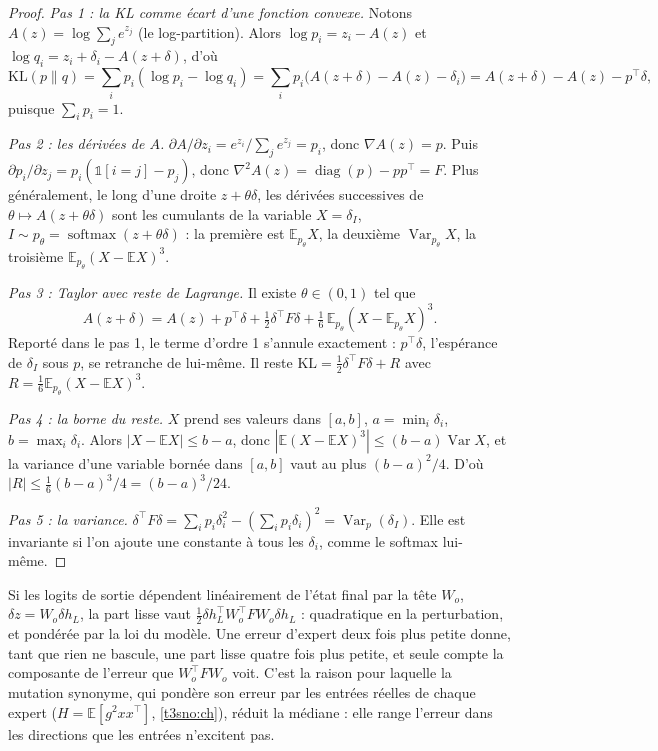 \begin{proof}
\emph{Pas 1 : la KL comme écart d'une fonction convexe.} Notons $A(z) = \log \sum_j e^{z_j}$ (le log-partition). Alors $\log p_i = z_i - A(z)$ et $\log q_i = z_i + \delta_i - A(z + \delta)$, d'où
\[
\mathrm{KL}(p\|q) = \sum_i p_i (\log p_i - \log q_i) = \sum_i p_i \bigl(A(z+\delta) - A(z) - \delta_i\bigr) = A(z + \delta) - A(z) - p^{\top}\delta,
\]
puisque $\sum_i p_i = 1$.

\emph{Pas 2 : les dérivées de $A$.} $\partial A/\partial z_i = e^{z_i}/\sum_j e^{z_j} = p_i$, donc $\nabla A(z) = p$. Puis $\partial p_i/\partial z_j = p_i(\mathbb{1}[i=j] - p_j)$, donc $\nabla^2 A(z) = \operatorname{diag}(p) - p p^{\top} = F$. Plus généralement, le long d'une droite $z + \theta\delta$, les dérivées successives de $\theta \mapsto A(z + \theta\delta)$ sont les cumulants de la variable $X = \delta_I$, $I \sim p_\theta = \operatorname{softmax}(z + \theta\delta)$ : la première est $\mathbb{E}_{p_\theta}X$, la deuxième $\operatorname{Var}_{p_\theta}X$, la troisième $\mathbb{E}_{p_\theta}(X - \mathbb{E}X)^3$.

\emph{Pas 3 : Taylor avec reste de Lagrange.} Il existe $\theta \in (0, 1)$ tel que
\[
A(z+\delta) = A(z) + p^{\top}\delta + \tfrac12 \delta^{\top}F\delta + \tfrac16\, \mathbb{E}_{p_\theta}(X - \mathbb{E}_{p_\theta}X)^3.
\]
Reporté dans le pas 1, le terme d'ordre 1 s'annule exactement : $p^{\top}\delta$, l'espérance de $\delta_I$ sous $p$, se retranche de lui-même. Il reste $\mathrm{KL} = \frac12\delta^{\top}F\delta + R$ avec $R = \frac16\mathbb{E}_{p_\theta}(X - \mathbb{E}X)^3$.

\emph{Pas 4 : la borne du reste.} $X$ prend ses valeurs dans $[a, b]$, $a = \min_i\delta_i$, $b = \max_i\delta_i$. Alors $|X - \mathbb{E}X| \le b - a$, donc $|\mathbb{E}(X-\mathbb{E}X)^3| \le (b-a)\operatorname{Var}X$, et la variance d'une variable bornée dans $[a,b]$ vaut au plus $(b-a)^2/4$. D'où $|R| \le \frac16 (b-a)^3/4 = (b-a)^3/24$.

\emph{Pas 5 : la variance.} $\delta^{\top}F\delta = \sum_i p_i\delta_i^2 - (\sum_i p_i\delta_i)^2 = \operatorname{Var}_p(\delta_I)$. Elle est invariante si l'on ajoute une constante à tous les $\delta_i$, comme le softmax lui-même.
\end{proof}

\begin{remarque}\label{t3syn:rem:lisse}
Si les logits de sortie dépendent linéairement de l'état final par la tête $W_o$, $\delta z = W_o \delta h_L$, la part lisse vaut $\frac12 \delta h_L^{\top} W_o^{\top} F W_o \delta h_L$ : quadratique en la perturbation, et pondérée par la loi du modèle. Une erreur d'expert deux fois plus petite donne, tant que rien ne bascule, une part lisse quatre fois plus petite, et seule compte la composante de l'erreur que $W_o^{\top}FW_o$ voit. C'est la raison pour laquelle la mutation synonyme, qui pondère son erreur par les entrées réelles de chaque expert ($H = \mathbb{E}[g^2 x x^{\top}]$, \cref{t3sno:ch}), réduit la médiane : elle range l'erreur dans les directions que les entrées n'excitent pas.
\end{remarque}

